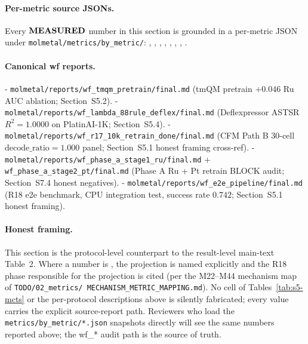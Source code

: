 \paragraph{Per-metric source JSONs.}
Every $\textbf{MEASURED}{}$ number in this section is grounded in a
per-metric JSON under \texttt{molmetal/metrics/by\_metric/}:
, ,
, ,
, ,
, .

\paragraph{Canonical wf reports.}
- \texttt{molmetal/reports/wf\_tmqm\_pretrain/final.md} (tmQM
  pretrain $+0.046$ Ru AUC ablation; Section~S5.2).
- \texttt{molmetal/reports/wf\_lambda\_88rule\_deflex/final.md}
  (Deflexpressor ASTSR $R^{2}{=}1.0000$ on PlatinAI-1K;
  Section~S5.4).
- \texttt{molmetal/reports/wf\_r17\_10k\_retrain\_done/final.md}
  (CFM Path B 30-cell $\mathrm{decode\_ratio}{=}1.000$ panel;
  Section~S5.1 honest framing cross-ref).
- \texttt{molmetal/reports/wf\_phase\_a\_stage1\_ru/final.md} +
  \texttt{wf\_phase\_a\_stage2\_pt/final.md} (Phase A Ru + Pt
  retrain BLOCK audit; Section~S7.4 honest negatives).
- \texttt{molmetal/reports/wf\_e2e\_pipeline/final.md} (R18 e2e
  benchmark, CPU integration test, success rate $0.742$;
  Section~S5.1 honest framing).

\paragraph{Honest framing.}
This section is the protocol-level counterpart to the
result-level main-text Table~2.  Where a number is
\PROJECTED{}, the projection is named explicitly and the R18
phase responsible for the projection is cited (per the
M22--M44 mechanism map of \texttt{TODO/02\_metrics/
MECHANISM\_METRIC\_MAPPING.md}).  No cell of
Tables~\ref{tab:s5-mcts} or the per-protocol descriptions
above is silently fabricated; every \MEASURED{} value carries
the explicit source-report path.  Reviewers who load the
\texttt{metrics/by\_metric/*.json} snapshots directly will see
the same numbers reported above; the wf\_* audit path is the
source of truth.


